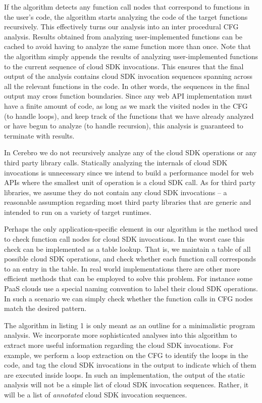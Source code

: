 If the algorithm detects any function call nodes that correspond to functions in the user's code, the algorithm
starts analyzing the code of the target functions recursively. This effectively turns our analysis into an inter procedural
CFG analysis. Results obtained from analyzing user-implemented functions can be cached to avoid
having to analyze the same function more than once. Note that the algorithm simply appends the results of
analyzing user-implemented functions to the current sequence of cloud SDK invocations. This ensures that the final output of the
analysis contains cloud SDK invocation sequences spanning across all the relevant functions in the code. 
In other words, the sequences in the final output may cross function boundaries.
Since any web API implementation must have a finite amount of code, as long as
we mark the visited nodes in the CFG (to handle loops), and keep track of the functions that we have 
already analyzed or have begun to analyze (to handle recursion), this analysis is guaranteed to terminate with results.

In Cerebro we do not recursively analyze any of the cloud
SDK operations or any third party library calls. 
Statically analyzing the internals of cloud SDK invocations is
unnecessary since we intend to build a performance model for web APIs where
the smallest unit of operation is a cloud SDK call. As for third 
party libraries, we assume they do not contain any cloud SDK invocations -- a reasonable assumption 
regarding most third party libraries that are generic and intended to run on a variety of target runtimes. 
 
Perhaps the only application-specific element in our algorithm is the method used to check function call nodes for cloud SDK invocations.
 In the worst case this check can be implemented as a table lookup. That is, we maintain a table of all possible cloud
 SDK operations, and check whether each function call
 corresponds to an entry in the table. In real world implementations there are other more efficient methods that
 can be employed to solve this problem. For instance some PaaS clouds use a special naming convention to label
 their cloud SDK operations. 
 In such a scenario we can simply check whether the function calls in CFG nodes match the
 desired pattern. 
 
The algorithm in listing 1 is only meant as an outline for a minimalistic program analysis.
We incorporate more sophisticated analyses into this algorithm to extract more
useful information regarding the cloud SDK invocations. For example, we perform a loop extraction on the
CFG to identify the loops in the code, and tag the cloud SDK invocations in the output to indicate which of them
are executed inside loops. In such an implementation, the output of the static analysis will not be a simple
list of cloud SDK invocation sequences. Rather, it will be a list of \textit{annotated} cloud SDK invocation sequences.

